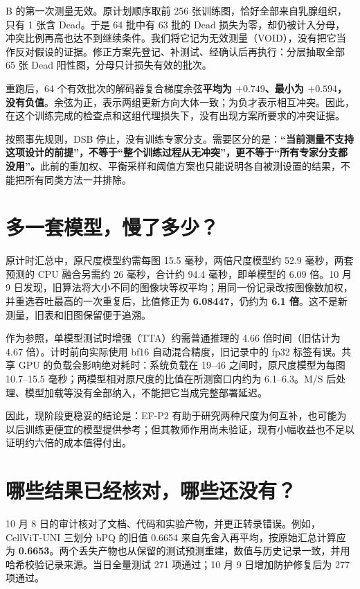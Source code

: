 \documentclass[12pt,a4paper]{article}
\begin{document}
B 的第一次测量无效。原计划顺序取前 256 张训练图，恰好全部来自乳腺组织，只有 1 张含 Dead。于是 64 批中有 63 批的 Dead 损失为零，却仍被计入分母，冲突比例再高也达不到继续条件。我们将它记为无效测量（VOID），没有把它当作反对假设的证据。修正方案先登记、补测试、经确认后再执行：分层抽取全部 65 张 Dead 阳性图，分母只计损失有效的批次。

重跑后，64 个有效批次的解码器复合梯度余弦\textbf{平均为 $+0.749$、最小为 $+0.594$，没有负值}。余弦为正，表示两组更新方向大体一致；为负才表示相互冲突。因此，在这个训练完成的检查点和这组代理损失下，没有出现方案所要求的冲突证据。

按照事先规则，DSB 停止，没有训练专家分支。需要区分的是：\textbf{“当前测量不支持这项设计的前提”，不等于“整个训练过程从无冲突”，更不等于“所有专家分支都没用”。}此前的重加权、平衡采样和阈值方案也只能说明各自被测设置的结果，不能把所有同类方法一并排除。

\section*{多一套模型，慢了多少？}

原计时汇总中，原尺度模型约需每图 15.5 毫秒，两倍尺度模型约 52.9 毫秒，两套预测的 CPU 融合另需约 26 毫秒，合计约 94.4 毫秒，即单模型的 6.09 倍。10 月 9 日发现，旧算法将大小不同的图像块等权平均；用同一份记录改按图像数加权，并重选吞吐最高的一次重复后，比值修正为 \textbf{6.08447}，仍约为 \textbf{6.1 倍}。这不是新测量，旧表和旧图保留便于追溯。

作为参照，单模型测试时增强（TTA）约需普通推理的 4.66 倍时间（旧估计为 4.67 倍）。计时前向实际使用 bf16 自动混合精度，旧记录中的 fp32 标签有误。共享 GPU 的负载会影响绝对耗时：系统负载在 19--46 之间时，原尺度模型为每图 10.7--15.5 毫秒；两模型相对原尺度的比值在所测窗口内约为 6.1--6.3。M/S 后处理、模型加载等没有全部纳入，不能把它当成完整部署延迟。

因此，现阶段更稳妥的结论是：EF-P2 有助于研究两种尺度为何互补，也可能为以后训练更便宜的模型提供参考；但其教师作用尚未验证，现有小幅收益也不足以证明约六倍的成本值得付出。

\section*{哪些结果已经核对，哪些还没有？}

10 月 8 日的审计核对了文档、代码和实验产物，并更正转录错误。例如，CellViT-UNI 三划分 bPQ 的旧值 0.6654 来自先舍入再平均，按原始汇总计算应为 \textbf{0.6653}。两个丢失产物也从保留的测试预测重建，数值与历史记录一致，并用哈希校验记录来源。当日全量测试 271 项通过；10 月 9 日增加防护修复后为 277 项通过。
\end{document}
